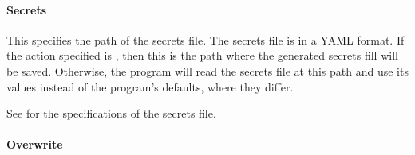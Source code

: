 \documentclass[letterpaper,11pt,english]{sphinxmanual}
\begin{document}
\paragraph{Secrets}
\label{\detokenize{user/command_line:secrets}}\label{\detokenize{user/command_line:user-command-line-available-options-secrets}}

\begin{savenotes}\begin{fulllineitems}
\label{\detokenize{user/command_line:cmdoption-secret}}
\pysigstartsignatures
{}
\pysigstopsignatures
\end{fulllineitems}\end{savenotes}


\sphinxAtStartPar
This specifies the path of the secrets file. The secrets file is
in a YAML format. If the action specified is {\hyperref[\detokenize{user/command_line:cmdoption-arg-generate}]{}}, then this is
the path where the generated secrets fill will be saved. Otherwise, the
program will read the secrets file at this path and use its values
instead of the program’s defaults, where they differ.

\sphinxAtStartPar
See {\hyperref[\detokenize{user/configuration:user-configuration-secrets-configuration-file}]{}} for the
specifications of the secrets file.


\paragraph{Overwrite}
\label{\detokenize{user/command_line:overwrite}}

\begin{savenotes}\begin{fulllineitems}
\label{\detokenize{user/command_line:cmdoption-overwrite}}
\pysigstartsignatures
{}
\pysigstopsignatures
\end{fulllineitems}\end{savenotes}
\end{document}
